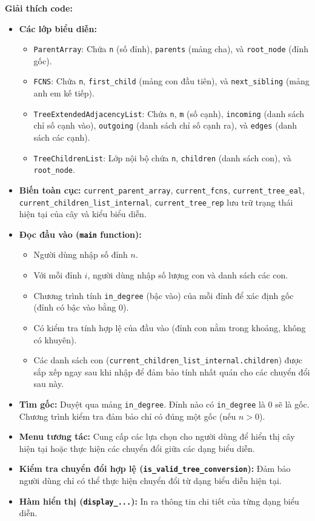 \documentclass{article}
\begin{document}
\textbf{Giải thích code:}

\begin{itemize}
    \item \textbf{Các lớp biểu diễn:}
    \begin{itemize}
        \item \texttt{ParentArray}: Chứa \texttt{n} (số đỉnh), \texttt{parents} (mảng cha), và \texttt{root\_node} (đỉnh gốc).
        \item \texttt{FCNS}: Chứa \texttt{n}, \texttt{first\_child} (mảng con đầu tiên), và \texttt{next\_sibling} (mảng anh em kế tiếp).
        \item \texttt{TreeExtendedAdjacencyList}: Chứa \texttt{n}, \texttt{m} (số cạnh), \texttt{incoming} (danh sách chỉ số cạnh vào), \texttt{outgoing} (danh sách chỉ số cạnh ra), và \texttt{edges} (danh sách các cạnh).
        \item \texttt{TreeChildrenList}: Lớp nội bộ chứa \texttt{n}, \texttt{children} (danh sách con), và \texttt{root\_node}.
    \end{itemize}
    \item \textbf{Biến toàn cục:} \texttt{current\_parent\_array}, \texttt{current\_fcns}, \texttt{current\_tree\_eal}, \texttt{current\_children\_list\_internal}, \texttt{current\_tree\_rep} lưu trữ trạng thái hiện tại của cây và kiểu biểu diễn.
    \item \textbf{Đọc đầu vào (\texttt{main} function):}
    \begin{itemize}
        \item Người dùng nhập số đỉnh $n$.
        \item Với mỗi đỉnh $i$, người dùng nhập số lượng con và danh sách các con.
        \item Chương trình tính \texttt{in\_degree} (bậc vào) của mỗi đỉnh để xác định gốc (đỉnh có bậc vào bằng 0).
        \item Có kiểm tra tính hợp lệ của đầu vào (đỉnh con nằm trong khoảng, không có khuyên).
        \item Các danh sách con (\texttt{current\_children\_list\_internal.children}) được sắp xếp ngay sau khi nhập để đảm bảo tính nhất quán cho các chuyển đổi sau này.
    \end{itemize}
    \item \textbf{Tìm gốc:} Duyệt qua mảng \texttt{in\_degree}. Đỉnh nào có \texttt{in\_degree} là 0 sẽ là gốc. Chương trình kiểm tra đảm bảo chỉ có đúng một gốc (nếu $n > 0$).
    \item \textbf{Menu tương tác:} Cung cấp các lựa chọn cho người dùng để hiển thị cây hiện tại hoặc thực hiện các chuyển đổi giữa các dạng biểu diễn.
    \item \textbf{Kiểm tra chuyển đổi hợp lệ (\texttt{is\_valid\_tree\_conversion}):} Đảm bảo người dùng chỉ có thể thực hiện chuyển đổi từ dạng biểu diễn hiện tại.
    \item \textbf{Hàm hiển thị (\texttt{display\_...}):} In ra thông tin chi tiết của từng dạng biểu diễn.
\end{itemize}
\end{document}
